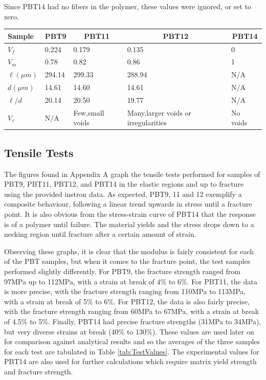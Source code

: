 \documentclass[11pt]{article}
\begin{document}
Since PBT14 had no fibers in the polymer, these values were ignored, or set to zero.
\onehalfspacing
\begin{center}
 \label{tab:MeasuredValues}
\begin{tabular}{p{1.5cm} || p{} | p{} | p{} | p{}}
\hline
Sample & \multicolumn{1}{c|}{PBT9} & \multicolumn{1}{c|}{PBT11} & \multicolumn{1}{c|}{PBT12} & \multicolumn{1}{c}{PBT14} \\
\hline
\hline
\(V_f\) & 0.224 & 0.179 & 0.135 & 0\\
\(V_m\) & 0.78 & 0.82 & 0.86 & 1 \\
\(\ell (\mu m)\) & 294.14 & 299.33 & 288.94 & N/A\\
\(d (\mu m) \) & 14.61 & 14.60 & 14.61 & N/A\\
\(\ell /d\) & 20.14 & 20.50 & 19.77 & N/A\\
\(V_v\) & N/A & Few,small voids & Many,larger voids or irregularities & No voids\\
\hline
\end{tabular}
\end{center}

\subsection{Tensile Tests}
The figures found in Appendix A graph the tensile tests performed for samples of PBT9, PBT11, PBT12, and PBT14 in the elastic regions and up to fracture using the provided instron data. As expected, PBT9, 11 and 12 exemplify a composite behaviour, following a linear trend upwards in stress until a fracture point. It is also obvious from the stress-strain curve of PBT14  that the response is of a polymer until failure. The material yields and the stress drops down to a necking region until fracture after a certain amount of strain.

Observing these graphs, it is clear that the modulus is fairly consistent for each of the PBT samples, but when it comes to the fracture point, the test samples performed slightly differently. For PBT9, the fracture strength ranged from 97MPa up to 112MPa, with a strain at break of 4\% to 6\%. For PBT11, the data is more precise, with the fracture strength ranging from 110MPa to 113MPa, with a strain at break of 5\% to 6\%. For PBT12, the data is also fairly precise, with the fracture strength ranging from 60MPa to 67MPa, with a strain at break of 4.5\% to 5\%. Finally, PBT14 had precise fracture strengths (31MPa to 34MPa), but very diverse strains at break (40\% to 130\%). These values are used later on for comparison against analytical results and so the averages of the three samples for each test are tabulated in Table \ref{tab:TestValues}. The experimental values for PBT14 are also used for further calculations which require matrix yield strength and fracture strength.
\end{document}
